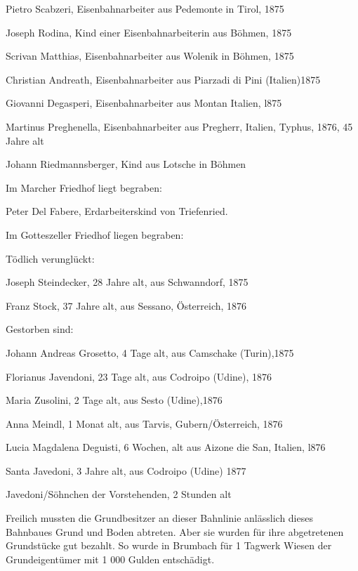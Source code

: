 \documentclass{book}
\begin{document}
Pietro Scabzeri, Eisenbahnarbeiter aus Pedemonte in Tirol, 1875

Joseph Rodina, Kind einer Eisenbahnarbeiterin aus Böhmen, 1875

Scrivan Matthias, Eisenbahnarbeiter aus Wolenik in Böhmen, 1875

Christian Andreath, Eisenbahnarbeiter aus Piarzadi di Pini (Italien)1875

Giovanni Degasperi, Eisenbahnarbeiter aus Montan Italien, l875

Martinus Preghenella, Eisenbahnarbeiter aus Pregherr, Italien, Typhus, 1876, 45
Jahre alt

Johann Riedmannsberger, Kind aus Lotsche in Böhmen



Im Marcher Friedhof liegt begraben:



Peter Del Fabere, Erdarbeiterskind von Triefenried.



Im Gotteszeller Friedhof liegen begraben:



Tödlich verunglückt:



Joseph Steindecker, 28 Jahre alt, aus Schwanndorf, 1875

Franz Stock, 37 Jahre alt, aus Sessano, Österreich, 1876



Gestorben sind:



Johann Andreas Grosetto, 4 Tage alt, aus Camschake (Turin),1875

Florianus Javendoni, 23 Tage alt, aus Codroipo (Udine), 1876

Maria Zusolini, 2 Tage alt, aus Sesto (Udine),1876

Anna Meindl, 1 Monat alt, aus Tarvis, Gubern/Österreich, 1876

Lucia Magdalena Deguisti, 6 Wochen, alt aus Aizone die San, Italien, l876

Santa Javedoni, 3 Jahre alt, aus Codroipo (Udine) 1877

Javedoni/Söhnchen der Vorstehenden, 2 Stunden alt



Freilich mussten die Grundbesitzer an dieser Bahnlinie anlässlich dieses
Bahnbaues Grund und Boden abtreten. Aber sie wurden für ihre abgetretenen
Grundstücke gut bezahlt. So wurde in Brumbach für 1 Tagwerk Wiesen der
Grundeigentümer mit 1 000 Gulden entschädigt.
\end{document}
